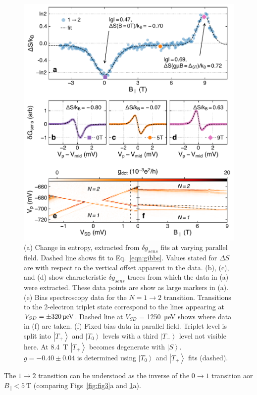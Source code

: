\documentclass[twocolumn,showpacs,amsmath,amssymb,prl,aps,superscriptaddress]{revtex4-1}
\newcommand{\ket}[1]{\ensuremath{\left|#1\right\rangle}}
\begin{document}
\begin{figure}
        \includegraphics[width=1.0\columnwidth]{../figures/figure_4.pdf}
        \caption{\label{fig:fig4}(a) Change in entropy, extracted from $\delta g_{sens}$ fits at varying parallel field. Dashed line shows fit to Eq.~\ref{eqn:gibbs}. Values stated for $\Delta S$ are with respect to the vertical offset apparent in the data. (b), (c), and (d) show characteristic $\delta g_{sens}$ traces from which the data in (a) were extracted. These data points are show as large markers in (a). (e) Bias spectroscopy data for the $N=1 \rightarrow 2$ transition. Transitions to the 2-electron triplet state correspond to the lines appearing at $V_{SD} = \SI{\pm 320}{\micro\electronvolt}$. Dashed line at $V_{SD}$ = \SI{1250}{\micro\electronvolt} shows where data in (f) are taken. (f) Fixed bias data in parallel field. Triplet level is split into $\ket{T_+}$ and $\ket{T_0}$ levels with a third $\ket{T_-}$ level not visible here. At \SI{8.4}{\tesla} $\ket{T_+}$ becomes degenerate with $\ket{S}$. $g=-0.40\pm0.04$ is determined using $\ket{T_0}$ and $\ket{T_+}$ fits (dashed).}
\end{figure}

The $1\rightarrow 2$ transition can be understood as the inverse of the $0 \rightarrow 1$ transition aor $B_\parallel < \SI{5}{\tesla}$ (comparing Figs~\ref{fig:fig3}a and \ref{fig:fig4}a). 
\end{document}
